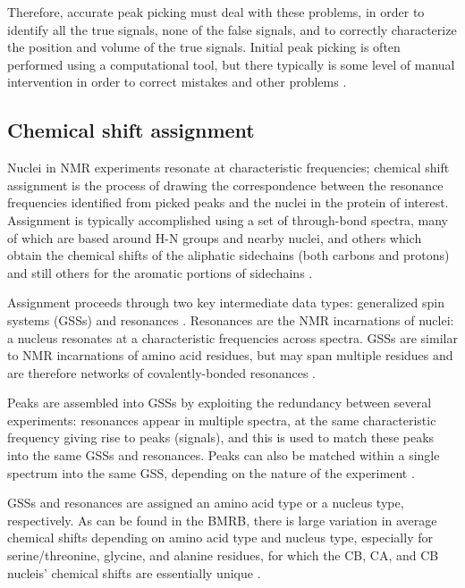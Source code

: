 Therefore, accurate peak picking must deal with these problems, in order to
identify all the true signals, none of the false signals, and to correctly 
characterize the position and volume of the true signals.  Initial peak picking
is often performed using a computational tool, but there typically is some
level of manual intervention in order to correct mistakes and other problems
\cite{guerry2011automated}.

\subsection*{Chemical shift assignment}

Nuclei in NMR experiments resonate at characteristic frequencies; 
chemical shift assignment is the process of drawing the correspondence between
the resonance frequencies identified from picked peaks and the nuclei in the
protein of interest.  Assignment is typically accomplished using a set of
through-bond spectra, many of which are based around H-N groups and nearby
nuclei, and others which obtain the chemical shifts of the aliphatic sidechains
(both carbons and protons) and still others for the aromatic portions of
sidechains \cite{hnco, hncacb, cbcaconh, hbhaconh, cconhtocsy}.

Assignment proceeds through two key intermediate data types: generalized spin
systems (GSSs) and resonances \cite{bmrb, ccpn}.  
Resonances are the NMR incarnations of nuclei: a nucleus resonates at a 
characteristic frequencies across spectra.  GSSs
are similar to NMR incarnations of amino acid residues, but may span
multiple residues and are therefore networks of covalently-bonded resonances
\cite{abacus_assignment}.

Peaks are assembled into GSSs by exploiting the redundancy between several 
experiments: resonances appear in multiple spectra, at the same characteristic
frequency giving rise to peaks (signals), and this is used to match these
peaks into the same GSSs and resonances.  Peaks can also be matched within
a single spectrum into the same GSS, depending on the nature of the experiment
\cite{ccpn}.

GSSs and resonances are assigned an amino acid type or a nucleus type, 
respectively.  As can be found in the BMRB, there is large variation in 
average chemical shifts depending on amino acid type and nucleus type,
especially for serine/threonine, glycine, and alanine residues, for which the
CB, CA, and CB nucleis' chemical shifts are essentially unique
\cite{guntert2009automated}.

